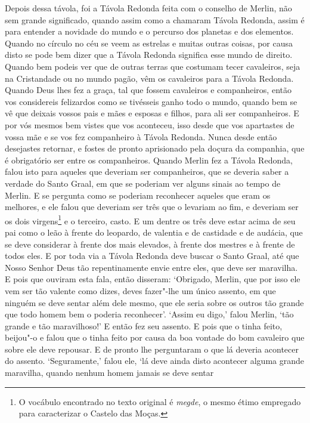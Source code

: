 Depois dessa távola, foi a Távola Redonda feita com o conselho de Merlin, não
sem grande significado, quando assim como a chamaram Távola Redonda, assim é
para entender a novidade do mundo e o percurso dos planetas e dos elementos.
Quando no círculo no céu se veem as estrelas e muitas outras coisas, por causa
disto se pode bem dizer que a Távola Redonda significa esse mundo de direito.
Quando bem podeis ver que de outras terras que costumam tecer cavaleiros, seja
na Cristandade ou no mundo pagão, vêm os cavaleiros para a Távola Redonda.
Quando Deus lhes fez a graça, tal que fossem cavaleiros e companheiros, então
vos considereis felizardos como se tivésseis ganho todo o mundo, quando bem se
vê que deixais vossos pais e mães e esposas e filhos, para ali ser
companheiros. E por vós mesmos bem vistes que vos aconteceu, isso desde que vos
apartastes de vossa mãe e se vos fez companheiro à Távola Redonda. Nunca desde
então desejastes retornar, e fostes de pronto aprisionado pela doçura da
companhia, que é obrigatório ser entre os companheiros. Quando Merlin fez a
Távola Redonda, falou isto para aqueles que deveriam ser companheiros, que se
deveria saber a verdade do Santo Graal, em que se poderiam ver alguns sinais ao
tempo de Merlin. E se pergunta como se poderiam reconhecer aqueles que eram os
melhores, e ele falou que deveriam ser três que o levariam ao fim, e deveriam
ser os dois virgens\footnote{ O vocábulo encontrado no texto original é
\textit{megde}, o mesmo étimo empregado para caracterizar o Castelo das Moças.}  
e o terceiro, casto. E um dentre os três deve estar acima de seu
pai como o leão à frente do leopardo, de valentia e de castidade e de audácia,
que se deve considerar à frente dos mais elevados, à frente dos mestres e à
frente de todos eles. E por toda via a Távola Redonda deve buscar o Santo
Graal, até que Nosso Senhor Deus tão repentinamente envie entre eles, que deve
ser maravilha. E pois que ouviram esta fala, então disseram: ‘Obrigado, Merlin,
que por isso ele vem ser tão valente como dizes, deves fazer"-lhe um único
assento, em que ninguém se deve sentar além dele mesmo,  que ele seria sobre os
outros tão grande que todo homem bem o poderia reconhecer’. ‘Assim eu digo,’
falou Merlin, ‘tão grande e tão maravilhoso!’ E então fez seu assento. E pois
que o tinha feito, beijou"-o e falou que o tinha feito por causa da boa vontade
do bom cavaleiro que sobre ele deve repousar. E de pronto lhe perguntaram o que
lá deveria acontecer do assento. ‘Seguramente,’ falou ele, `lá deve ainda disto
acontecer alguma grande maravilha, quando nenhum homem jamais se deve sentar
